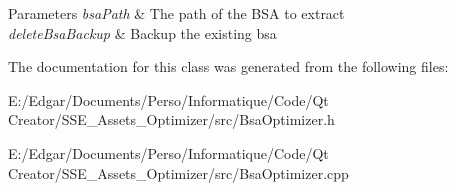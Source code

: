 \begin{DoxyParams}{Parameters}
{\em bsa\+Path} & The path of the B\+SA to extract \\
\hline
{\em delete\+Bsa\+Backup} & Backup the existing bsa \\
\hline
\end{DoxyParams}


The documentation for this class was generated from the following files\+:\begin{DoxyCompactItemize}
\item 
E\+:/\+Edgar/\+Documents/\+Perso/\+Informatique/\+Code/\+Qt Creator/\+S\+S\+E\+\_\+\+Assets\+\_\+\+Optimizer/src/Bsa\+Optimizer.\+h\item 
E\+:/\+Edgar/\+Documents/\+Perso/\+Informatique/\+Code/\+Qt Creator/\+S\+S\+E\+\_\+\+Assets\+\_\+\+Optimizer/src/Bsa\+Optimizer.\+cpp\end{DoxyCompactItemize}
